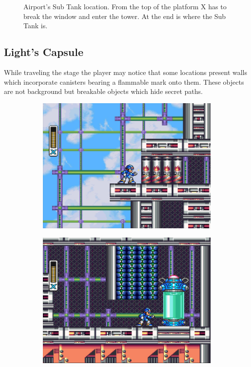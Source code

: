 \begin{figure}[htp]
\begin{subfigure}{0.4\linewidth}
		\caption{}
	\end{subfigure}
	\caption{Airport's Sub Tank location. From the top of the platform X has to break the window and enter the tower. At the end is where the Sub Tank is.}
\end{figure}

\subsection{Light's Capsule} 

While traveling the stage the player may notice that some locations present walls which incorporate canisters bearing a flammable mark onto them. These objects are not background but breakable objects which hide secret paths. 
\begin{figure}[htp]
	\centering
	\begin{subfigure}{0.4\linewidth}
		\centering
		\includegraphics[width=\linewidth]{figures/X1/Storm_eagle/Storm_armor_1.jpg}
		\caption{}
	\end{subfigure}
	\begin{subfigure}{0.4\linewidth}
		\centering
		\includegraphics[width=\linewidth]{figures/X1/Storm_eagle/Storm_armor_2.jpg}

\end{subfigure}
\end{figure}
